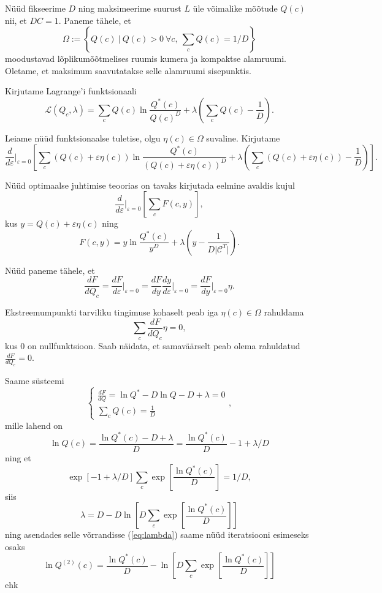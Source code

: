 Nüüd fikseerime $D$ ning maksimeerime suurust $L$ üle võimalike mõõtude $Q(c)$ nii, et $DC = 1$. Paneme tähele, et
$$\Omega := \left\{  Q(c) \ | \ Q(c) > 0\ \forall c,\ \sum_{c} Q(c) = 1/D\right\}$$
moodustavad lõplikumõõtmelises ruumis kumera ja kompaktse alamruumi. Oletame, et maksimum saavutatakse selle alamruumi sisepunktis.

Kirjutame Lagrange'i funktsionaali
$$
\mathcal{L}(Q_{c},\lambda) = \sum_{c} Q(c) \ln \frac{Q^*(c)}{Q(c)^D} + \lambda\left(\sum_{c} Q(c) - \frac{1}{D}\right).
$$

Leiame nüüd funktsionaalse tuletise, olgu $\eta(c) \in \Omega$ suvaline. Kirjutame
$$
\frac{d}{d\varepsilon}\Big\vert_{\varepsilon=0} \left[\sum_{c} (Q(c)+     \varepsilon \eta(c)) \ln \frac{Q^*(c)}{(Q(c)+\varepsilon \eta(c))^D} + \lambda\left(\sum_{c} (Q(c)+\varepsilon \eta(c)) - \frac{1}{D}\right)\right].
$$

Nüüd optimaalse juhtimise teoorias on tavaks \parencite{lellep2013} kirjutada eelmine avaldis kujul
$$
\frac{d}{d\varepsilon}\Big\vert_{\varepsilon=0} \left[\sum_{c}F(c, y)\right],
$$
kus $y = Q(c) + \varepsilon \eta(c)$ ning
$$
F(c,y) = y \ln \frac{Q^*(c)}{y^D} + \lambda\left(y - \frac{1}{D\vert\mathcal{C}^T\vert}\right).
$$

Nüüd paneme tähele, et 
$$\frac{dF}{d Q_{c}} = \frac{dF}{d \varepsilon}\Big\vert_{\varepsilon=0} = \frac{dF}{dy} \frac{dy}{d\varepsilon}\Big\vert_{\varepsilon=0} = \frac{dF}{dy} \Big\vert_{\varepsilon=0} \eta. $$

Ekstreemumpunkti tarviliku tingimuse kohaselt peab iga $\eta(c) \in \Omega$ rahuldama 
$$\sum_{c} \frac{dF}{dQ_{c}} \eta = 0,$$
kus $0$ on nullfunktsioon. Saab näidata, et samaväärselt peab olema rahuldatud $\frac{dF}{dQ_{c}} = 0$.

Saame süsteemi
$$\begin{cases}
\frac{dF}{dQ} = \ln Q^* - D \ln Q - D + \lambda = 0\\
\sum_{c} Q(c) = \frac{1}{D}
\end{cases},$$
mille lahend on
\begin{equation}
    \label{eq:lambda}
    \ln Q(c) = \frac{\ln Q^*(c) - D + \lambda}{D} = \frac{\ln Q^*(c)}{D} - 1 + \lambda/D
\end{equation}
ning et
$$
    \exp\left[-1 + \lambda/D \right] \sum_{c} \exp \left[\frac{\ln Q^*(c)}{D}\right] = 1/D,
$$ siis
$$\lambda = D - D \ln \left[ D \sum_{c} \exp \left[\frac{\ln Q^*(c)}{D}\right] \right]$$
ning asendades selle võrrandisse (\ref{eq:lambda}) saame nüüd iteratsiooni esimeseks osaks
$$ \ln Q^{(2)}(c) = \frac{\ln Q^*(c)}{D} - \ln \left[ D \sum_{c} \exp \left[\frac{\ln Q^*(c)}{D}\right] \right]$$
ehk


